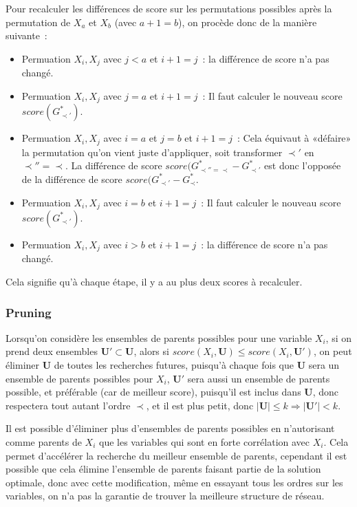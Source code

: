 \documentclass[french,a4paper]{article}
\begin{document}
Pour recalculer les différences de score sur les permutations
possibles après la permutation de $X_a$ et $X_b$ (avec $a + 1 = b$),
on procède donc de la manière suivante~:
\begin{itemize}
\item Permuation $X_i,X_j$ avec $j < a$ et $i+1=j$~: la différence de
  score n'a pas changé.
\item Permuation $X_i,X_j$ avec $j = a$ et $i+1=j$~: Il faut calculer
  le nouveau score $score(G^*_{\prec'})$.
\item Permuation $X_i,X_j$ avec $i = a$ et $j = b$ et $i+1=j$~: Cela
  équivaut à «défaire» la permutation qu'on vient juste d'appliquer,
  soit transformer $\prec'$ en $\prec''=\prec$. La différence de score
  $score(G^*_{\prec'' = \prec}-G^*_{\prec'}$ est donc l'opposée de la
  différence de score $score(G^*_{\prec'}-G^*_{\prec}$.
\item Permuation $X_i,X_j$ avec $i = b$ et $i+1=j$~: Il faut calculer
  le nouveau score $score(G^*_{\prec'})$.
\item Permuation $X_i,X_j$ avec $i > b$ et $i+1=j$~: la différence de
  score n'a pas changé.
\end{itemize}
Cela signifie qu'à chaque étape, il y a au plus deux scores à
recalculer.

\subsubsection{Pruning}

Lorsqu'on considère les ensembles de parents possibles pour une
variable $X_i$, si on prend deux ensembles $\mathbf{U}' \subset
\mathbf{U}$, alors si $score(X_i, \mathbf{U}) \leq score(X_i,
\mathbf{U'})$, on peut éliminer $\mathbf{U}$ de toutes les recherches
futures, puisqu'à chaque fois que $\mathbf{U}$ sera un ensemble de
parents possibles pour $X_i$, $\mathbf{U}'$ sera aussi un ensemble de
parents possible, et préférable (car de meilleur score), puisqu'il est
inclus dans $\mathbf{U}$, donc respectera tout autant l'ordre $\prec$,
et il est plus petit, donc $|\mathbf{U}| \leq k \Rightarrow
|\mathbf{U}'| < k$.

Il est possible d'éliminer plus d'ensembles de parents possibles en
n'autorisant comme parents de $X_i$ que les variables qui sont en
forte corrélation avec $X_i$. Cela permet d'accélérer la recherche du
meilleur ensemble de parents, cependant il est possible que cela
élimine l'ensemble de parents faisant partie de la solution optimale,
donc avec cette modification, même en essayant tous les ordres sur les
variables, on n'a pas la garantie de trouver la meilleure structure de
réseau.
\end{document}
